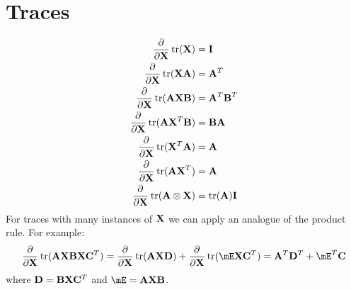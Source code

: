 \section{Traces}
\begin{align}
\pd{}{\mX}\trace(\mX)             &=\mI            \\
\pd{}{\mX}\trace(\mX\mA)          &=\mA^T          \\
\pd{}{\mX}\trace(\mA\mX\mB)       &=\mA^T\mB^T     \\
\pd{}{\mX}\trace(\mA\mX^T\mB)     &=\mB\mA         \\
\pd{}{\mX}\trace(\mX^T\mA)        &=\mA            \\
\pd{}{\mX}\trace(\mA\mX^T)        &=\mA            \\
\pd{}{\mX}\trace(\mA\kp\mX)       &=\trace(\mA)\mI 
\end{align}
For traces with many instances of $\mX$ we can apply an analogue of the product rule. For example:
\begin{equation}
\pd{}{\mX}\trace(\mA\mX\mB\mX\mC^T)=\pd{}{\mX}\trace(\mA\mX\mD)+\pd{}{\mX}\trace(\mE\mX\mC^T)=\mA^T\mD^T+\mE^T\mC
\end{equation}
where $\mD=\mB\mX\mC^T$ and $\mE=\mA\mX\mB$.